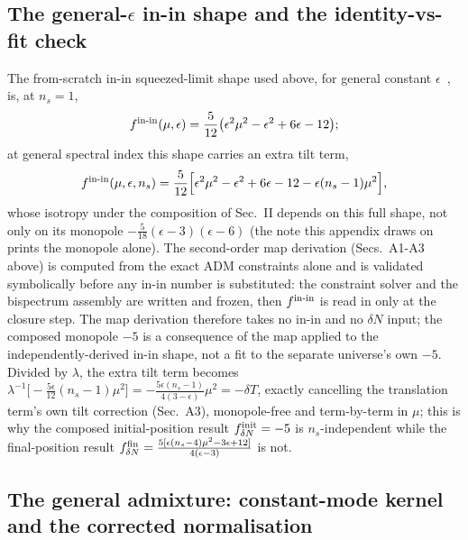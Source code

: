 \documentclass[aps,prd,twocolumn,superscriptaddress,showpacs,preprintnumbers,nofootinbib,longbibliography,floatfix]{revtex4-2}
\newcommand{\eps}{\epsilon}
\begin{document}
\subsection{The general-$\eps$ in-in shape and the identity-vs-fit check}

The from-scratch in-in squeezed-limit shape used above, for general constant
$\eps$~\cite{Golden2026Monopole}, is, at $n_s=1$,
\begin{equation}
f^{\rm in\text{-}in}(\mu,\eps)=\frac{5}{12}\big(\eps^2\mu^2-\eps^2+6\eps-12\big);
\end{equation}
at general spectral index this shape carries an extra tilt term,
\begin{equation}
f^{\rm in\text{-}in}(\mu,\eps,n_s)=\frac{5}{12}\Big[\eps^2\mu^2-\eps^2+6\eps-12-\eps(n_s-1)\mu^2\Big],
\end{equation}
whose isotropy under the composition of Sec.~II depends on this full shape, not only on its
monopole $-\tfrac{5}{18}(\eps-3)(\eps-6)$ (the note this appendix draws on prints the monopole
alone). The second-order map derivation (Secs.~A1-A3 above) is computed from the exact ADM
constraints alone and is validated symbolically before any in-in number is substituted: the
constraint solver and the bispectrum assembly are written and frozen, then $f^{\rm in\text{-}in}$
is read in only at the closure step. The map derivation therefore takes no in-in and no
$\delta N$ input; the composed monopole $-5$ is a consequence of the map applied to the
independently-derived in-in shape, not a fit to the separate universe's own $-5$. Divided by
$\lambda$, the extra tilt term becomes $\lambda^{-1}\big[-\tfrac{5\eps}{12}(n_s-1)\mu^2\big]
=-\tfrac{5\eps(n_s-1)}{4(3-\eps)}\mu^2=-\delta T$, exactly cancelling the translation term's
own tilt correction (Sec.~A3), monopole-free and term-by-term in $\mu$; this is why the
composed initial-position result $f_{\delta N}^{\rm init}=-5$ is $n_s$-independent while the
final-position result $f_{\delta N}^{\rm fin}=\tfrac{5[\eps(n_s-4)\mu^2-3\eps+12]}{4(\eps-3)}$
is not.

\subsection{The general admixture: constant-mode kernel and the corrected normalisation}
\label{app:kc}
\end{document}
